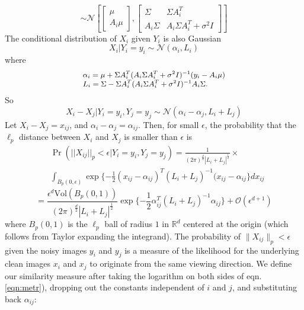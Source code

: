\begin{equation}
 \sim \mathcal{N} \left[\begin{bmatrix} \mu \\ A_i \mu \end{bmatrix}, \begin{bmatrix} \Sigma & \Sigma A_i^T \\ A_i \Sigma & A_i \Sigma A_i^T + \sigma^2 I \end{bmatrix} \right]
\end{equation}
\noindent
The conditional distribution of $X_i$ given $Y_i$ is also Gaussian 
 \begin{equation}
  {X_i|Y_i} = y_i \sim \mathcal{N}(\alpha_i, L_i)
 \end{equation}
where 
\begin{equation}
\small{
\begin{array}{l}\alpha_i = \mu + \Sigma A_i^T (A_i \Sigma A_i^T + \sigma^2 I)^{-1} (y_i - A_i \mu) \\ L_i = \Sigma - \Sigma A_i^T (A_i \Sigma A_i^T + \sigma^2 I)^{-1} A_i \Sigma .
       \end{array}}  
\end{equation}
So
\begin{equation}
X_i - X_j|Y_i=y_i, Y_j=y_j \sim \mathcal{N}(\alpha_i-\alpha_j, L_i+L_j)
\end{equation}
Let $X_i - X_j = x_{ij}$, and $\alpha_i -\alpha_j=\alpha_{ij}$. Then, for small $\epsilon$, the probability that the $\ell_p$ distance between $X_i$ and $X_j$ is smaller than $\epsilon$ is
\begin{align}
&\Pr(||X_{ij}||_{p} < \epsilon|Y_i=y_i,Y_j=y_j)   \nonumber
										=   \frac{1}{(2 \pi)^{\frac{d}{2}} |L_{i}+L_{j}|^ \frac{1}{2}} \times \\ 
										& \int_{B_p(0,\epsilon) }^{}\exp \{ -\frac{1}{2}(x_{ij} - \alpha_{ij})^T(L_i+L_j)^{-1}(x_{ij} - \alpha_{ij}\}dx_{ij} 
\end{align}
\begin{equation}
= \frac{\epsilon^d \text{Vol}(B_p(0,1)) }{(2 \pi)^{\frac{d}{2}} |L_i + L_j|^{\frac{1}{2}}} \exp\{-\frac{1}{2}\alpha_{ij}^T(L_i+L_j)^{-1}\alpha_{ij}\} +  \mathcal{O}(\epsilon^{d+1}) 
\label{eqn:metr}
\end{equation}
where $B_p(0,1)$ is the $\ell_p$ ball of radius $1$ in $\mathbb{R}^d$ centered at the origin (which follows from Taylor expanding the integrand). The probability of $\|X_{ij}\|_p < \epsilon$ given the noisy images $y_i$ and $y_j$  is a measure of the likelihood for the underlying clean images $x_i$ and $x_j$ to originate from the same viewing direction. We define our similarity measure after taking the logarithm on both sides of eqn. \ref{eqn:metr}), dropping out the constants independent of $i$ and $j$, and substituting back $\alpha_{ij}$:
